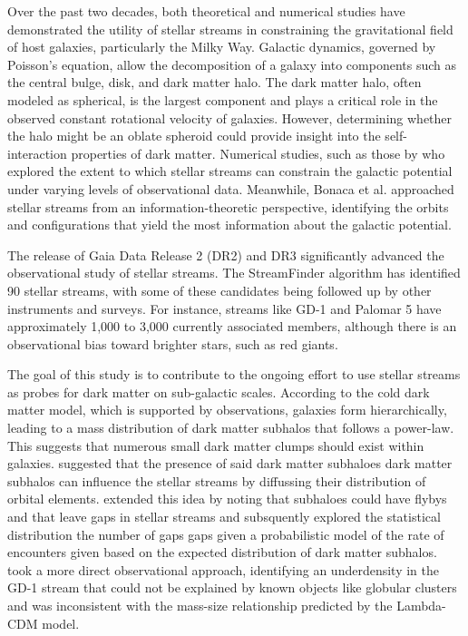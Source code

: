 \documentclass[]{aa}
\begin{document}
  Over the past two decades, both theoretical and numerical studies have demonstrated the utility of stellar streams in constraining the gravitational field of host galaxies, particularly the Milky Way. Galactic dynamics, governed by Poisson's equation, allow the decomposition of a galaxy into components such as the central bulge, disk, and dark matter halo. The dark matter halo, often modeled as spherical, is the largest component and plays a critical role in the observed constant rotational velocity of galaxies. However, determining whether the halo might be an oblate spheroid could provide insight into the self-interaction properties of dark matter. Numerical studies, such as those by \citet{varghese2011stellar} who explored the extent to which stellar streams can constrain the galactic potential under varying levels of observational data. Meanwhile, Bonaca et al. approached stellar streams from an information-theoretic perspective, identifying the orbits and configurations that yield the most information about the galactic potential.

  The release of Gaia Data Release 2 (DR2) and DR3 significantly advanced the observational study of stellar streams. The StreamFinder algorithm has identified 90 stellar streams, with some of these candidates being followed up by other instruments and surveys. For instance, streams like GD-1 and Palomar 5 have approximately 1,000 to 3,000 currently associated members, although there is an observational bias toward brighter stars, such as red giants.

  The goal of this study is to contribute to the ongoing effort to use stellar streams as probes for dark matter on sub-galactic scales. According to the cold dark matter model, which is supported by observations, galaxies form hierarchically, leading to a mass distribution of dark matter subhalos that follows a power-law. This suggests that numerous small dark matter clumps should exist within galaxies. \citet{rodrigo_ibata_uncovering_2002} suggested that the presence of said dark matter subhaloes dark matter subhalos can influence the stellar streams by diffussing their distribution of orbital elements. \citet{r_g_carlberg_pal_2012} extended this idea by noting that subhaloes could have flybys and that leave gaps in stellar streams and subsquently explored the statistical distribution the number of gaps gaps given a probabilistic model of the rate of encounters given based on the expected distribution of dark matter subhalos. \citet{bonaca_spur_2018} took a more direct observational approach, identifying an underdensity in the GD-1 stream that could not be explained by known objects like globular clusters and was inconsistent with the mass-size relationship predicted by the Lambda-CDM model.
\end{document}
